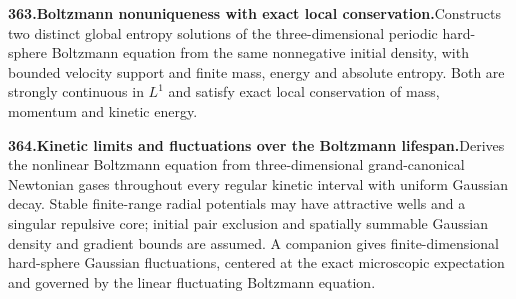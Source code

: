 \documentclass[11pt,a4paper]{article}
\begin{document}
  \par \begin{minipage}{\linewidth}
  \fontsize{10.5}{12.6}\selectfont\RaggedRight
  \hypertarget{result 363}{}
  {\bfseries\textcolor{muted}{363.}\enspace Boltzmann nonuniqueness with exact local conservation.}\enspace Constructs two distinct global entropy solutions of the three-dimensional periodic hard-sphere Boltzmann equation from the same nonnegative initial density, with bounded velocity support and finite mass, energy and absolute entropy. Both are strongly continuous in $L^1$ and satisfy exact local conservation of mass, momentum and kinetic energy.\par
  \end{minipage}\par\vspace{5pt}



  \par \begin{minipage}{\linewidth}
  \fontsize{10.5}{12.6}\selectfont\RaggedRight
  \hypertarget{result 364}{}
  {\bfseries\textcolor{muted}{364.}\enspace Kinetic limits and fluctuations over the Boltzmann lifespan.}\enspace Derives the nonlinear Boltzmann equation from three-dimensional grand-canonical Newtonian gases throughout every regular kinetic interval with uniform Gaussian decay. Stable finite-range radial potentials may have attractive wells and a singular repulsive core; initial pair exclusion and spatially summable Gaussian density and gradient bounds are assumed. A companion gives finite-dimensional hard-sphere Gaussian fluctuations, centered at the exact microscopic expectation and governed by the linear fluctuating Boltzmann equation.\par
  \end{minipage}\par\vspace{5pt}
\end{document}
